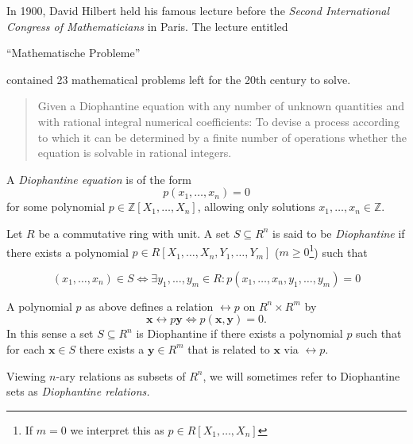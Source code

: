 
In 1900, David Hilbert held his famous lecture before the \emph{Second International Congress of Mathematicians} in Paris.
The lecture entitled \begin{german}\enquote{Mathematische Probleme}\end{german} contained 23 mathematical problems left for the 20th century to solve.


\begin{quotation}
    Given a Diophantine equation with any number of unknown quantities and with rational integral numerical coefficients: To devise a process according to which it can be determined by a finite number of operations whether the equation is solvable in rational integers.
\end{quotation}

A \emph{Diophantine equation} is of the form
%
\[ p(x_1, …, x_n) = 0 \]
%   
for some polynomial $p ∈ ℤ[X_1, …, X_n]$, allowing only solutions $x_1,…,x_n ∈ ℤ$.


\begin{defin}
    Let $R$ be a commutative ring with unit.
    A set $S \subseteq R^n$ is said to be \emph{Diophantine} if there exists a polynomial $p ∈ R[X_1,…,X_n, Y_1,…,Y_m]$ ($m ≥ 0$\footnote{If $m = 0$ we interpret this as $p ∈ R[X_1,…,X_n]$}) such that
    
    \[ (x_1,…,x_n) ∈ S \Leftrightarrow ∃y_1,…,y_m ∈ R: p(x_1,…,x_n,y_1,…,y_m) = 0 \]
\end{defin}

A polynomial $p$ as above defines a relation $\rel{p}$ on $R^n \times R^m$ by
%
\[ \mathbf{x} \rel{p} \mathbf{y} \Leftrightarrow
   p(\mathbf{x}, \mathbf{y}) = 0. \]
%
In this sense a set $S \subseteq R^n$ is Diophantine if there exists a polynomial $p$ such that for each $\mathbf x ∈ S$ there exists a $\mathbf y ∈ R^m$ that is related to $\mathbf x$ via $\rel p$.

Viewing $n$-ary relations as subsets of $R^n$, we will sometimes refer to Diophantine sets as \emph{Diophantine relations.}

